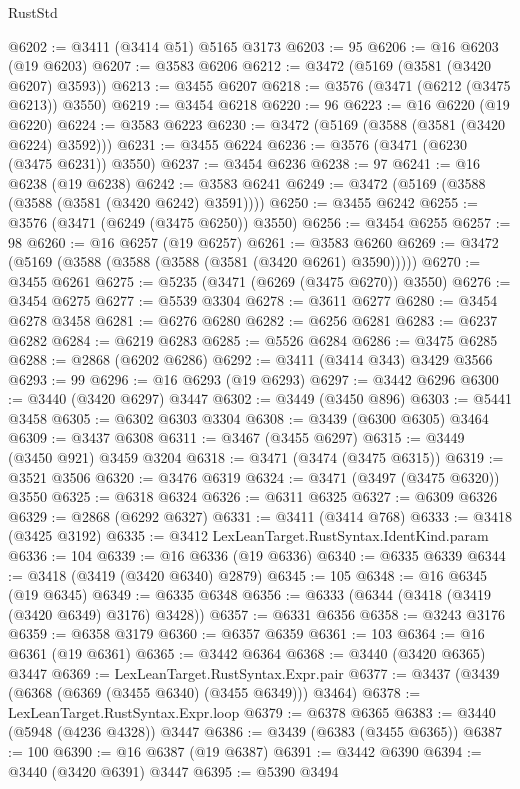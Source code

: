 \begin{lexlean}{RustStd}
\begin{coremodule}
{{{{{{{{{{{{{{{{{{{@6202 := @3411 (@3414 @51) @5165 @3173
@6203 := 95
@6206 := @16 @6203 (@19 @6203)
@6207 := @3583 @6206
@6212 := @3472 (@5169 (@3581 (@3420 @6207) @3593))
@6213 := @3455 @6207
@6218 := @3576 (@3471 (@6212 (@3475 @6213)) @3550)
@6219 := @3454 @6218
@6220 := 96
@6223 := @16 @6220 (@19 @6220)
@6224 := @3583 @6223
@6230 := @3472 (@5169 (@3588 (@3581 (@3420 @6224) @3592)))
@6231 := @3455 @6224
@6236 := @3576 (@3471 (@6230 (@3475 @6231)) @3550)
@6237 := @3454 @6236
@6238 := 97
@6241 := @16 @6238 (@19 @6238)
@6242 := @3583 @6241
@6249 := @3472 (@5169 (@3588 (@3588 (@3581 (@3420 @6242) @3591))))
@6250 := @3455 @6242
@6255 := @3576 (@3471 (@6249 (@3475 @6250)) @3550)
@6256 := @3454 @6255
@6257 := 98
@6260 := @16 @6257 (@19 @6257)
@6261 := @3583 @6260
@6269 := @3472 (@5169 (@3588 (@3588 (@3588 (@3581 (@3420 @6261) @3590)))))
@6270 := @3455 @6261
@6275 := @5235 (@3471 (@6269 (@3475 @6270)) @3550)
@6276 := @3454 @6275
@6277 := @5539 @3304
@6278 := @3611 @6277
@6280 := @3454 @6278 @3458
@6281 := @6276 @6280
@6282 := @6256 @6281
@6283 := @6237 @6282
@6284 := @6219 @6283
@6285 := @5526 @6284
@6286 := @3475 @6285
@6288 := @2868 (@6202 @6286)
@6292 := @3411 (@3414 @343) @3429 @3566
@6293 := 99
@6296 := @16 @6293 (@19 @6293)
@6297 := @3442 @6296
@6300 := @3440 (@3420 @6297) @3447
@6302 := @3449 (@3450 @896)
@6303 := @5441 @3458
@6305 := @6302 @6303 @3304
@6308 := @3439 (@6300 @6305) @3464
@6309 := @3437 @6308
@6311 := @3467 (@3455 @6297)
@6315 := @3449 (@3450 @921) @3459 @3204
@6318 := @3471 (@3474 (@3475 @6315))
@6319 := @3521 @3506
@6320 := @3476 @6319
@6324 := @3471 (@3497 (@3475 @6320)) @3550
@6325 := @6318 @6324
@6326 := @6311 @6325
@6327 := @6309 @6326
@6329 := @2868 (@6292 @6327)
@6331 := @3411 (@3414 @768)
@6333 := @3418 (@3425 @3192)
@6335 := @3412 LexLeanTarget.RustSyntax.IdentKind.param
@6336 := 104
@6339 := @16 @6336 (@19 @6336)
@6340 := @6335 @6339
@6344 := @3418 (@3419 (@3420 @6340) @2879)
@6345 := 105
@6348 := @16 @6345 (@19 @6345)
@6349 := @6335 @6348
@6356 := @6333 (@6344 (@3418 (@3419 (@3420 @6349) @3176) @3428))
@6357 := @6331 @6356
@6358 := @3243 @3176
@6359 := @6358 @3179
@6360 := @6357 @6359
@6361 := 103
@6364 := @16 @6361 (@19 @6361)
@6365 := @3442 @6364
@6368 := @3440 (@3420 @6365) @3447
@6369 := LexLeanTarget.RustSyntax.Expr.pair
@6377 := @3437 (@3439 (@6368 (@6369 (@3455 @6340) (@3455 @6349))) @3464)
@6378 := LexLeanTarget.RustSyntax.Expr.loop
@6379 := @6378 @6365
@6383 := @3440 (@5948 (@4236 @4328)) @3447
@6386 := @3439 (@6383 (@3455 @6365))
@6387 := 100
@6390 := @16 @6387 (@19 @6387)
@6391 := @3442 @6390
@6394 := @3440 (@3420 @6391) @3447
@6395 := @5390 @3494
}}}}}}}}}}}}}}}}}}}
\end{coremodule}
\end{lexlean}
